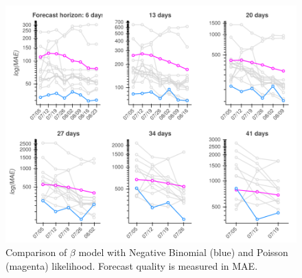 \documentclass[nobib]{tufte-handout}
\newcommand{\bAR}{\ensuremath{\beta}\text{-AR}\xspace}
\begin{document}
\begin{figure}[htbp]
\centering
\includegraphics[width=\columnwidth]{img/us_mae_loss_ablation/us_mae_granger_ablation.png}
\caption{\label{fig:mae-covidhub-loss}Comparison of \bAR model with Negative Binomial (blue) and Poisson (magenta) likelihood. Forecast quality is measured in MAE.}
\end{figure}
\end{document}
